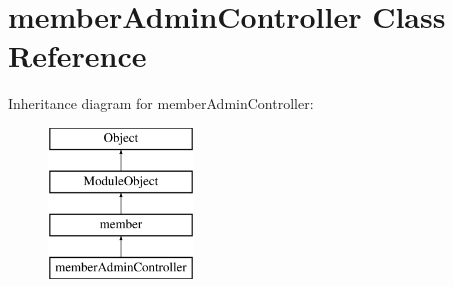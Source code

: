 \hypertarget{classmemberAdminController}{}\section{member\+Admin\+Controller Class Reference}
\label{classmemberAdminController}
Inheritance diagram for member\+Admin\+Controller\+:\begin{figure}[H]
\begin{center}
\leavevmode
\includegraphics[height=4.000000cm]{classmemberAdminController}
\end{center}
\end{figure}
